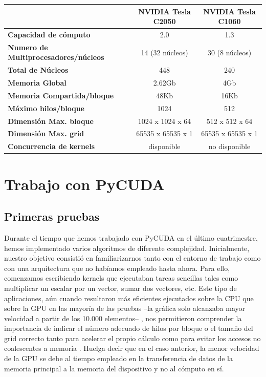 \documentclass[twoside]{article}
\begin{document}
\begin{center}
   \begin{tabular}{ | l | c | c | }
      \hline
      & \textbf{NVIDIA Tesla C2050} & \textbf{NVIDIA Tesla C1060} \\ \hline
      \textbf{Capacidad de cómputo} & 2.0 & 1.3 \\ \hline
      \textbf{Numero de Multiprocesadores/núcleos} & 14 (32 núcleos) & 30 (8 núcleos) \\ \hline
      \textbf{Total de Núcleos} & 448 & 240 \\ \hline
      \textbf{Memoria Global} & 2.62Gb & 4Gb \\ \hline
      \textbf{Memoria Compartida/bloque} & 48Kb & 16Kb \\ \hline
      \textbf{Máximo hilos/bloque} & 1024 & 512 \\ \hline
      \textbf{Dimensión Max. bloque} & 1024 x 1024 x 64 & 512 x 512 x 64 \\ \hline
      \textbf{Dimensión Max. grid} & 65535 x 65535 x 1 & 65535 x 65535 x 1 \\ \hline
      \textbf{Concurrencia de kernels} & disponible & no disponible \\
   \hline
   \end{tabular}
\end{center}

\section{Trabajo con PyCUDA}

\subsection{Primeras pruebas}

Durante el tiempo que hemos trabajado con PyCUDA en el último cuatrimestre, hemos implementado varios algoritmos de diferente complejidad. Inicialmente, nuestro objetivo consistió en familiarizarnos tanto con el entorno de trabajo como con una arquitectura que no habíamos empleado hasta ahora. Para ello, comenzamos escribiendo kernels que ejecutaban tareas sencillas tales como multiplicar un escalar por un vector, sumar dos vectores, etc. Este tipo de aplicaciones, aún cuando resultaron más eficientes ejecutados sobre la CPU que sobre la GPU en las mayoría de las pruebas --la gráfica solo alcanzaba mayor velocidad a partir de los 10.000 elementos-- , nos permitieron comprender la importancia de indicar el número adecuado de hilos por bloque o el tamaño del grid correcto tanto para acelerar el propio cálculo como para evitar los accesos no coalescentes a memoria \cite{cbestpractices}. Huelga decir que en el caso anterior, la menor velocidad de la GPU se debe al tiempo empleado en la transferencia de datos de la memoria principal a la memoria del dispositivo y no al cómputo en sí.
\end{document}
